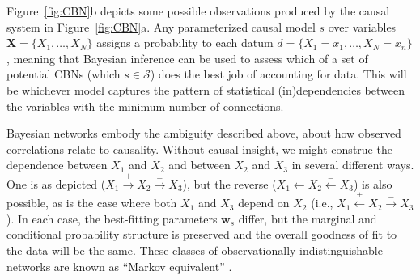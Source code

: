 \documentclass{cambridge7A}%
\newcommand{\ww}{\mathbf{w}} %
\newcommand{\dm}{d} %
\newcommand{\da}{\mathbf{d}} %
\begin{document}
Figure~\ref{fig:CBN}b depicts some possible observations %
produced by the causal system in Figure~\ref{fig:CBN}a. %
Any parameterized causal model $s$ over variables $\mathbf{X} =\{X_1, \ldots, X_N\}$ assigns a probability to each datum ${\dm}=\{X_1=x_1, \ldots, X_N=x_n\}$, meaning that Bayesian inference can be used to assess which of a set of potential CBNs (which $s\in\mathcal{S}$) does the best job of accounting for data.  This will be whichever model captures the pattern of statistical (in)dependencies between the variables with the minimum number of connections.  %

Bayesian networks embody the ambiguity described above, about how observed correlations relate to causality.  Without causal insight, we might construe the dependence between $X_1$ and $X_2$ and between $X_2$ and $X_3$ in several different ways.  One is as depicted ($X_1\!\stackrel{+}\rightarrow\!X_2\!\stackrel{-}\rightarrow\!X_3$), but the reverse ($X_1\!\stackrel{+}\leftarrow\!X_2\!\stackrel{-}\leftarrow\!X_3$) is also possible, as is the case where both $X_1$ and $X_3$ depend on $X_2$ (i.e., $X_1\!\stackrel{+}\leftarrow\!X_2\!\stackrel{-}\rightarrow\!X_3$).  In each case, the best-fitting parameters $\ww_s$ differ, but the marginal and conditional probability structure is 
preserved and the overall goodness of fit to the data will be the same.  These classes of observationally indistinguishable networks are known as ``Markov equivalent'' \citep{pearl2000causality}.
\end{document}
